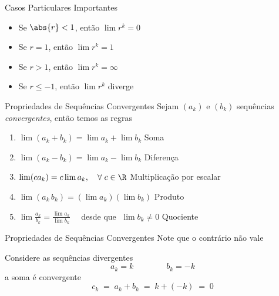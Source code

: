 \documentclass[fleqn,utf8,aspectratio=169,12pt]{beamer}
\begin{document}
\begin{frame}{Casos Particulares Importantes}
  \begin{itemize}[<+->]
    \setlength\itemsep{1.5em}
    \item Se $\abs{r}<1$, \tabto{25mm} então \(\lim r^k=0\)
    \item Se $r = 1$,     \tabto{25mm} então \(\lim r^k=1\)
    \item Se $r > 1$,     \tabto{25mm} então \(\lim r^k=\infty\)
    \item Se $r \leq -1$, \tabto{25mm} então \(\lim r^k\) diverge
  \end{itemize}
\end{frame}

\begin{frame}{Propriedades de Sequências Convergentes}
    Sejam $(a_k)$ e $(b_k)$ sequências \emph{convergentes}, então temos as regras \\[4mm]
    \pause
    \begin{enumerate}[<+->]
        \item $\lim (a_k+b_k) = \lim a_k + \lim b_k$                                                 \tabto{79mm} Soma                      \\[5mm]
        \item $\lim (a_k-b_k) = \lim a_k - \lim b_k$
        \tabto{79mm} Diferença                 \\[5mm]
        \item $\lim (c a_k)   = c\lim a_k,\quad \forall\; c\in\R$                                    \tabto{79mm} Multiplicação por escalar \\[5mm]
        \item $\lim (a_k\,b_k)= (\lim a_k)(\lim b_k)$                                                \tabto{79mm} Produto                   \\[5mm]
        \item \(\lim \frac{a_k}{b_k} = \frac{\lim a_k}{\lim b_k}\quad\) desde que $\;\lim b_k \neq 0$  \tabto{79mm} Quociente
    \end{enumerate}
\end{frame}

\begin{frame}{Propriedades de Sequências Convergentes}
	Note que o contrário não vale

	\pause
	\vspace{\baselineskip}
	Considere as sequências divergentes
	\[
		a_k = k \qquad\qquad b_k = -k
	\]
	\pause
  a soma é convergente
	\[
		c_k \;=\; a_k + b_k \;=\; k + (-k) \;=\; 0
	\]
\end{frame}
\end{document}
